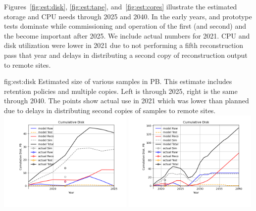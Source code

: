 \documentclass[../main-v1.tex]{subfiles}
\begin{document}
Figures~\ref{fig:est:disk}, \ref{fig:est:tape}, and~\ref{fig:est:cores} illustrate the estimated storage and CPU needs through 2025 and 2040.  In the early years,   and  prototype tests dominate while commissioning and operation of the first (and second)  and the  become important after 2025. We include actual numbers for 2021. CPU and disk utilization were lower in 2021 due to not performing a fifth reconstruction pass that year %
and delays in distributing a second copy of reconstruction output to remote sites. 

\begin{dunefigure}
{fig:est:disk}
{Estimated size of various samples in PB. This estimate includes retention policies and multiple copies. Left is through 2025, right is the same through 2040. The points show actual use in 2021 which was lower than planned due to delays in distributing second copies of samples to remote sites.}
\includegraphics[width=0.49\textwidth]{graphics/IntroFigures/2025/Parameters_2022-03-04-2025-Cumulative-Disk.png}
\includegraphics[width=0.49\textwidth]{graphics/IntroFigures/2040/Parameters_2022-03-04-2040-Cumulative-Disk.png}
\end{dunefigure}
\end{document}
